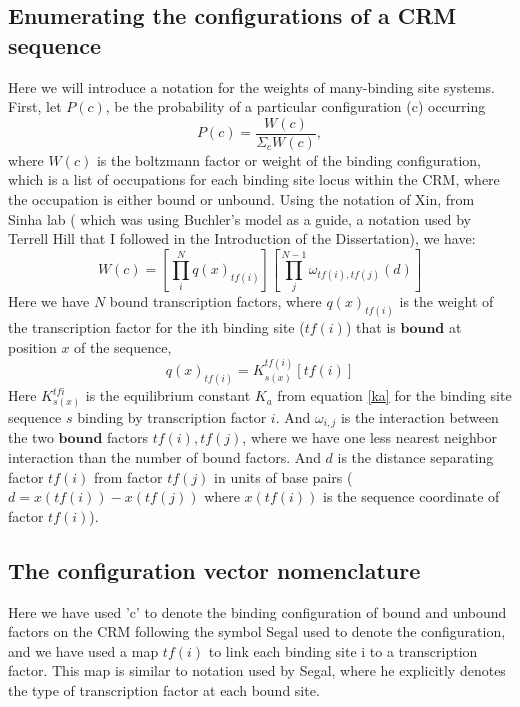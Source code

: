 \subsection{Enumerating the configurations of a CRM sequence }

 Here we will introduce a notation for the weights of many-binding site systems.  First, let $P(c)$, be the probability of a particular configuration (c) occurring
\begin{equation}\label{mbody}
    P(c) = \frac{W(c)}{\Sigma_c W(c)},
\end{equation}
where $ W(c)$ is the boltzmann factor or weight of the binding configuration, which is a list of occupations for each binding site locus within the CRM, where the occupation is either bound or unbound.   Using the notation of Xin, from Sinha lab ( which was using Buchler's model as a guide\cite{pmid20862354}\cite{pmid12702751}, a notation used by Terrell Hill that I followed in the Introduction of the Dissertation), we have:
\begin{equation}\label{wc}
    W(c)=  [\prod_i^N q(x)_{tf(i)} ] [\prod_{j}^{N-1} \omega_{tf(i),tf(j)}(d)]
\end{equation}
Here we have $N$ bound transcription factors, where $q(x)_{tf(i)}$ is the weight of the transcription factor for the ith binding site ($tf(i)$) that is $\textbf{bound}$ at position $x$ of the sequence, 
\begin{equation}\label{partitionf}
    q(x)_{tf(i)} = K_{s(x)}^{tf(i)} [tf(i)]
\end{equation}
Here $ K_{s(x)}^{tf{i}}$ is the equilibrium constant $K_a$ from equation \eqref{ka} for the binding site sequence $s$ binding by transcription factor $i$.  And $\omega_{i,j}$ is the interaction between the two $\textbf{bound}$ factors $tf(i),tf(j)$, where we have one less nearest neighbor interaction than the number of bound factors.  And $d$ is the distance separating factor $tf(i)$ from factor $tf(j)$ in units of base pairs ( $d = x(tf(i)) - x(tf(j))$ where $x(tf(i))$ is the sequence coordinate of factor $tf(i)$).
\subsection{The configuration vector nomenclature}

 Here we have used 'c' to denote the binding configuration of bound and unbound factors on the CRM following the symbol Segal used to denote the configuration, and we have used a map $tf(i)$ to link each binding site i to a transcription factor.  This map is similar to notation used by Segal, where he explicitly denotes the type of transcription factor at each bound site.
 
